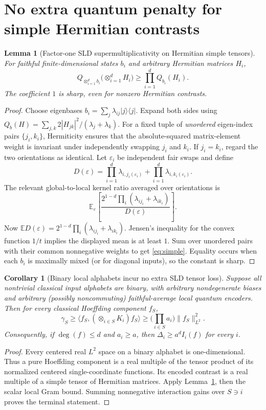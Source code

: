 \documentclass[11pt]{article}
\newtheorem{lemma}{Lemma}
\newtheorem{corollary}{Corollary}
\newcommand{\E}{\mathbb E}
\begin{document}
\section{No extra quantum penalty for simple Hermitian contrasts}
\begin{lemma}[Factor-one SLD supermultiplicativity on Hermitian simple tensors]\label{lem:product}
For faithful finite-dimensional states $b_i$ and arbitrary Hermitian matrices $H_i$,
\begin{equation}\label{eq:simple}
 \boxed{Q_{\otimes_{i=1}^d b_i}\bigl(\otimes_{i=1}^d H_i\bigr)
 \ge\prod_{i=1}^d Q_{b_i}(H_i).}
\end{equation}
The coefficient $1$ is sharp, even for nonzero Hermitian contrasts.
\end{lemma}
\begin{proof}
Choose eigenbases $b_i=\sum_j\lambda_{ij}|j\rangle\langle j|$. Expand both sides using $Q_b(H)=\sum_{j,k}2|H_{jk}|^2/(\lambda_j+\lambda_k)$. For a fixed tuple of \emph{unordered} eigen-index pairs $\{j_i,k_i\}$, Hermiticity ensures that the absolute-squared matrix-element weight is invariant under independently swapping $j_i$ and $k_i$. If $j_i=k_i$, regard the two orientations as identical. Let $\varepsilon_i$ be independent fair swaps and define
\[
 D(\varepsilon)=\prod_{i=1}^d \lambda_{i,j_i(\varepsilon_i)}
 +\prod_{i=1}^d \lambda_{i,k_i(\varepsilon_i)}.
\]
The relevant global-to-local kernel ratio averaged over orientations is
\[
 \E_{\varepsilon}\left[
 \frac{2^{1-d}\prod_i(\lambda_{ij_i}+\lambda_{ik_i})}{D(\varepsilon)}\right].
\]
Now $\E D(\varepsilon)=2^{1-d}\prod_i(\lambda_{ij_i}+\lambda_{ik_i})$. Jensen's inequality for the convex function $1/t$ implies the displayed mean is at least $1$. Sum over unordered pairs with their common nonnegative weights to get \eqref{eq:simple}. Equality occurs when each $b_i$ is maximally mixed (or for diagonal inputs), so the constant is sharp.
\end{proof}

\begin{corollary}[Binary local alphabets incur no extra SLD tensor loss]\label{cor:binary}
Suppose all nontrivial classical input alphabets are binary, with arbitrary nondegenerate biases and arbitrary (possibly noncommuting) faithful-average local quantum encoders. Then for every classical Hoeffding component $f_S$,
\[
 \boxed{\gamma_S\ge\langle f_S,(\otimes_{i\in S}K_i)f_S\rangle
 \ge\bigl(\prod_{i\in S}a_i\bigr)\|f_S\|_{L^2}^2.}
\]
Consequently, if $\deg(f)\le d$ and $a_i\ge a$, then $\Delta_i\ge a^d I_i(f)$ for every $i$.
\end{corollary}
\begin{proof}
Every centered real $L^2$ space on a binary alphabet is one-dimensional. Thus a pure Hoeffding component is a real multiple of the tensor product of its normalized centered single-coordinate functions. Its encoded contrast is a real multiple of a simple tensor of Hermitian matrices. Apply Lemma~\ref{lem:product}, then the scalar local Gram bound. Summing nonnegative interaction gains over $S\ni i$ proves the terminal statement.
\end{proof}
\end{document}
